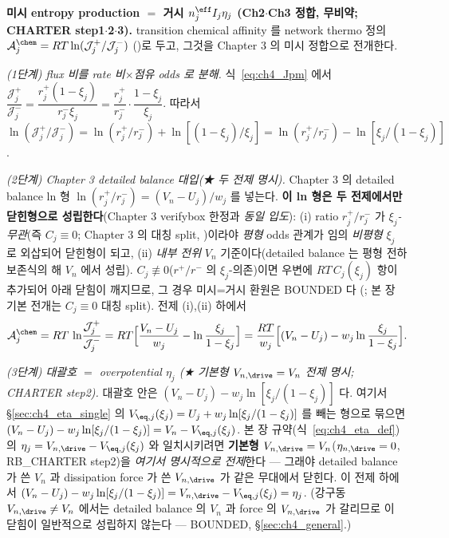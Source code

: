 \begin{verifybox}
\textbf{미시 entropy production $=$ 거시 $n_j^{\eff}I_j\eta_j$ (Ch2$\cdot$Ch3 정합, 무비약; CHARTER step1$\cdot$2$\cdot$3).}
transition chemical affinity 를 network thermo 정의 $\mathcal A_j^{\chem}=RT\ln(\mathcal J_j^+/\mathcal J_j^-)$
()로 두고, 그것을 Chapter 3 의 미시 정합으로 전개한다.

\emph{(1단계) flux 비를 rate 비$\times$점유 odds 로 분해.} 식~\eqref{eq:ch4_Jpm} 에서
$\dfrac{\mathcal J_j^+}{\mathcal J_j^-}=\dfrac{r_j^+(1-\xi_j)}{r_j^-\xi_j}=\dfrac{r_j^+}{r_j^-}\cdot\dfrac{1-\xi_j}{\xi_j}$.
따라서 $\ln(\mathcal J_j^+/\mathcal J_j^-)=\ln(r_j^+/r_j^-)+\ln[(1-\xi_j)/\xi_j]=\ln(r_j^+/r_j^-)-\ln[\xi_j/(1-\xi_j)]$.

\emph{(2단계) Chapter 3 detailed balance 대입(★ 두 전제 명시).} Chapter 3 의 detailed balance ln 형
$\ln(r_j^+/r_j^-)=(V_n-U_j)/w_j$ 를 넣는다. \textbf{이 ln 형은 두 전제에서만 닫힌형으로 성립한다}(Chapter 3
verifybox 한정과 \emph{동일 입도}): (i) ratio $r_j^+/r_j^-$ 가 $\xi_j$\emph{-무관}(즉 $C_j\equiv0$; Chapter 3 의
대칭 split, )이라야 \emph{평형} odds 관계가 임의 \emph{비평형} $\xi_j$ 로 외삽되어 닫힌형이 되고, (ii)
\emph{내부 전위} $V_n$ 기준이다(detailed balance 는 평형 전하보존식의 해 $V_n$ 에서 성립). $C_j\not\equiv0$($r^+/r^-$
의 $\xi_j$-의존)이면 우변에 $RT\,C_j(\xi_j)$ 항이 추가되어 아래 닫힘이 깨지므로, 그 경우 미시=거시 환원은 BOUNDED 다
(; 본 장 기본 전개는 $C_j\equiv0$ 대칭 split). 전제 (i),(ii) 하에서
\begin{equation}
\mathcal A_j^{\chem}=RT\,\ln\!\frac{\mathcal J_j^+}{\mathcal J_j^-}
=RT\Big[\frac{V_n-U_j}{w_j}-\ln\frac{\xi_j}{1-\xi_j}\Big]
=\frac{RT}{w_j}\Big[(V_n-U_j)-w_j\ln\frac{\xi_j}{1-\xi_j}\Big].
\label{eq:ch4_affinity_raw}
\end{equation}

\emph{(3단계) 대괄호 $=$ overpotential $\eta_j$ (★ 기본형 $V_{n,\drive}=V_n$ 전제 명시; CHARTER step2).}
대괄호 안은 $(V_n-U_j)-w_j\ln[\xi_j/(1-\xi_j)]$ 다. 여기서 \S\ref{sec:ch4_eta_single} 의 $V_{\eq,j}(\xi_j)=U_j
+w_j\ln[\xi_j/(1-\xi_j)]$ 를 빼는 형으로 묶으면 $(V_n-U_j)-w_j\ln[\xi_j/(1-\xi_j)]=V_n-V_{\eq,j}(\xi_j)$. 본 장
규약(식~\eqref{eq:ch4_eta_def})의 $\eta_j=V_{n,\drive}-V_{\eq,j}(\xi_j)$ 와 일치시키려면 \textbf{기본형
$V_{n,\drive}=V_n$}($\eta_{n,\drive}=0$, RB\_CHARTER step2)을 \emph{여기서 명시적으로 전제}한다 — 그래야
detailed balance 가 쓴 $V_n$ 과 dissipation force 가 쓴 $V_{n,\drive}$ 가 같은 무대에서 닫힌다. 이 전제 하에서
$(V_n-U_j)-w_j\ln[\xi_j/(1-\xi_j)]=V_{n,\drive}-V_{\eq,j}(\xi_j)=\eta_j$. (강구동 $V_{n,\drive}\ne V_n$ 에서는
detailed balance 의 $V_n$ 과 force 의 $V_{n,\drive}$ 가 갈리므로 이 닫힘이 일반적으로 성립하지 않는다 —
BOUNDED, \S\ref{sec:ch4_general}.)


\end{verifybox}
